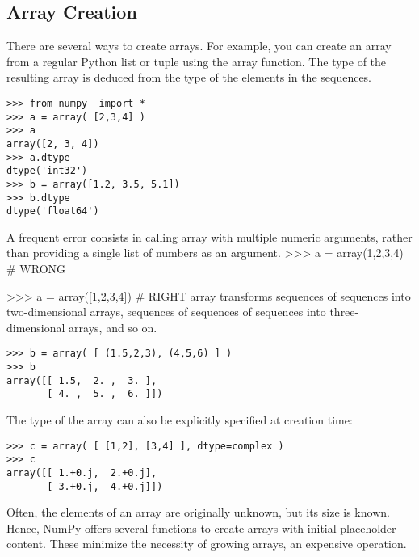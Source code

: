 \subsection{Array Creation}
There are several ways to create arrays.
For example, you can create an array from a regular Python list or tuple using the array function. The type of the resulting array is deduced from the type of the elements in the sequences.
\begin{verbatim}
>>> from numpy  import *
>>> a = array( [2,3,4] )
>>> a
array([2, 3, 4])
>>> a.dtype
dtype('int32')
>>> b = array([1.2, 3.5, 5.1])
>>> b.dtype
dtype('float64')
\end{verbatim}
A frequent error consists in calling array with multiple numeric arguments, rather than providing a single list of numbers as an argument.
>>> a = array(1,2,3,4)    # WRONG

>>> a = array([1,2,3,4])  # RIGHT
array transforms sequences of sequences into two-dimensional arrays, sequences of sequences of sequences into three-dimensional arrays, and so on.
\begin{verbatim}
>>> b = array( [ (1.5,2,3), (4,5,6) ] )
>>> b
array([[ 1.5,  2. ,  3. ],
       [ 4. ,  5. ,  6. ]])
\end{verbatim}
The type of the array can also be explicitly specified at creation time:
\begin{verbatim}
>>> c = array( [ [1,2], [3,4] ], dtype=complex )
>>> c
array([[ 1.+0.j,  2.+0.j],
       [ 3.+0.j,  4.+0.j]])
\end{verbatim}
Often, the elements of an array are originally unknown, but its size is known. Hence, NumPy offers several functions to create arrays with initial placeholder content. These minimize the necessity of growing arrays, an expensive operation.

